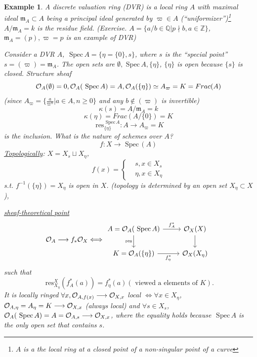 \documentclass[11pt]{article}
\newtheorem{ex}[thm]{Example}
\newcommand{\spec}{\text{ Spec}\,}
\newcommand{\res}{\text{ res}}
\newcommand{\intg}{\mathbb Z}
\newcommand{\ratl}{\mathbb Q}
\newcommand{\scm}{{\mathfrak m}}
\newcommand{\calo}{{\cal O}}
\newcommand{\lrta}{\longrightarrow}
\newcommand{\Llrta}{\Longleftrightarrow}
\begin{document}
\begin{ex}
A discrete valuation ring (DVR) is a local ring $A$ with maximal ideal $\scm_A\subset A$ being a principal ideal generated by $\varpi\in A$ (``uniformizer'')\footnote{$A$ is a the local ring at a closed point of  a non-singular point of a curve}
$A/\scm_A=k$ is the residue field. (Exercise. $A=\{a/b\in \ratl|p\nmid b,a\in \intg\}$, $\scm_A=(p),\varpi =p$ is an example of DVR)

Consider a DVR $A$, $\spec A=\{\eta=\{0\},s\}$, where $s$ is  the ``special point'' $s=(\varpi)=\scm_A$. The open sets are $\emptyset, \spec A, \{\eta\}$, $\{\eta\}$ is open because $\{s\}$ is closed. Structure sheaf
$$
\calo_A(\emptyset)=0,\calo_A(\spec A)=A, \calo_A(\{\eta\})\simeq A_\varpi=K=Frac(A)
$$
(since $A_\varpi=\{\frac{a}{\varpi^n}| a\in A, n\geq 0\}$ and any $b\notin (\varpi) $ is invertible)
$$
\kappa(s)=A/\scm_A=k
$$
$$
\kappa(\eta)=Frac(A/\{0\})=K
$$
$$
\res^{\spec A}_{\{\eta\}}:A\lrta A_\varpi=K
$$
is the inclusion. What is the nature of schemes over $A$?
$$
f:X\lrta \spec(A)
$$
\underline{Topologically}: $X=X_s\sqcup X_\eta$,
$$
f(x)=\left\{\begin{aligned}
&s, x\in X_s\\
& \eta, x\in X_\eta
\end{aligned}\right.
$$
s.t. $f^{-1}(\{\eta\})=X_\eta$ is open in $X$. (topology is determined by an open set $X_\eta\subset X$),

\underline{sheaf-theoretical point}
$$
\calo_A\lrta f_*\calo_X\Llrta \begin{tikzcd}
A=\calo_A(\spec A) \arrow[r, "f^*_A"] \arrow[d, "\res"'] & \calo_X(X) \arrow[d] \\
K=\calo_A(\{\eta\}) \arrow[r, "f^*_\eta"'] & \calo_X(X_\eta)
\end{tikzcd}
$$
such that 
$$
\res^X_{X_\eta}(f^*_A(a))=f^*_\eta(a)(\text{ viewed a elements of }K).
$$
It is locally ringed $\forall x, \calo_{A,f(x)}\lrta \calo_{X,x}$ local $\Llrta \forall x\in X_\eta$, $\calo_{A,\eta}=A_\eta=K\lrta \calo_{X,x}$ (always local) and 
$\forall s\in X_s$, $\calo_A(\spec A)=A=\calo_{A,s}\lrta \calo_{X,x}$, where the equality holds because $\spec A$ is the only open set that contains $s$.
\end{ex}
\end{document}
